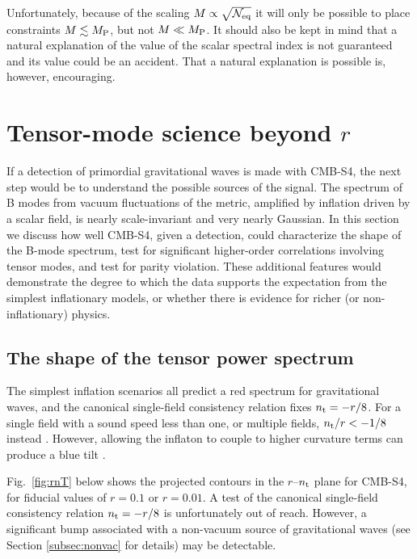 Unfortunately, because of the scaling $M\propto \sqrt{\mathcal{N}_{\rm eq}}$ it will only be possible to place constraints $M\lesssim M_{\rm P}$, but not $M\ll M_{\rm P}$. It should also be kept in mind that a natural explanation of the value of the scalar spectral index is not guaranteed and its value could be an accident. That a natural explanation is possible is, however, encouraging.

\section{Tensor-mode science beyond $r$}
\label{sec:beyond_r}

If a detection of primordial gravitational waves is made with CMB-S4, the next step would be to understand the possible sources of the signal. The spectrum of B modes from vacuum fluctuations of the metric, amplified by inflation driven by a scalar field, is nearly scale-invariant and very nearly Gaussian. In this section we discuss how well CMB-S4, given a detection, could characterize the shape of the B-mode spectrum, test for significant higher-order correlations involving tensor modes, and test for parity violation. These additional features would demonstrate the degree to which the data supports the expectation from the simplest inflationary models, or whether there is evidence for richer (or non-inflationary) physics. %

\subsection{The shape of the tensor power spectrum}
The simplest inflation scenarios all predict a red spectrum for gravitational waves, and the canonical single-field consistency relation fixes $n_{\rm t}=-r/8$. For a single field with a sound speed less than one, or multiple fields, $n_{\rm t}/r<-1/8$ instead \cite{Price:2014ufa}.  However, allowing the inflaton to couple to higher curvature terms can produce a blue tilt \cite{Baumann:2015xxa}. 

Fig.~\ref{fig:rnT} below shows the projected contours in the $r$--$n_{\rm t}$ plane for CMB-S4, for fiducial values of $r=0.1$ or $r=0.01$. A test of the canonical single-field consistency relation $n_{\rm t}=-r/8$ is unfortunately out of reach. However, a significant bump associated with a non-vacuum source of gravitational waves (see Section \ref{subsec:nonvac} for details) may be detectable. 

